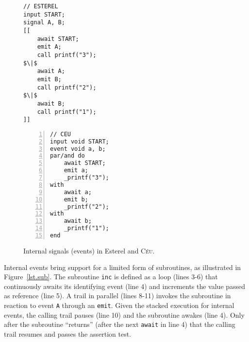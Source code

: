 \documentclass{acm_proc_article-sp}
\newcommand{\CEU}{\textsc{C\'{e}u}\xspace}
\newcommand{\code}[1] {{\small{\texttt{#1}}}}
\newcommand{\1}{\;}
\newcommand{\2}{\;\;}
\newcommand{\3}{\;\;\;}
\newcommand{\5}{\;\;\;\;\;}
\begin{document}
\begin{figure}[!t]
\begin{minipage}[t]{0.45\linewidth}
\begin{lstlisting}[mathescape=true]
// ESTEREL
input START;
signal A, B;
[[
    await START;
    emit A;
    call printf("3");
$\|$
    await A;
    emit B;
    call printf("2");
$\|$
    await B;
    call printf("1");
]]
\end{lstlisting}
\end{minipage}
%
\begin{minipage}[t]{0.50\linewidth}
\begin{lstlisting}[numbers=left,xleftmargin=3em]
// CEU
input void START;
event void a, b;
par/and do
    await START;
    emit a;
    _printf("3");
with
    await a;
    emit b;
    _printf("2");
with
    await b;
    _printf("1");
end
\end{lstlisting}
\end{minipage}
\caption{ Internal signals (events) in Esterel and \CEU. \newline
\label{lst.prints}
}
\end{figure}

\begin{comment}
{\small
The order of execution for the \code{printf} calls in Esterel is unspecified.
For \CEU, they always print $1$, $2$, and $3$, in this exact order.
}
Signals in Esterel have immediate feedback, i.e., an \code{await} statement can 
react to an \code{emit} in the same time it is reached.
In \CEU, only previously awaiting trails can react to an event.

immediate feedback
    flip-flops
- synthesis of digital circuits
immediate feedback (digital components as simple as flip-flops

causality complications
Note that both internal and external events are unbuffered, i.e., at the moment 
an event occurs, only previously awaiting trails can react to that instance.
\end{comment}

Internal events bring support for a limited form of subroutines, as illustrated 
in Figure~\ref{lst.sub}.
The subroutine \code{inc} is defined as a loop (lines 3-6) that continuously 
awaits its identifying event (line 4) and increments the value passed as 
reference (line 5).
A trail in parallel (lines 8-11) invokes the subroutine in reaction to event 
\code{A} through an \code{emit}.
Given the stacked execution for internal events, the calling trail pauses (line 
10) and the subroutine awakes (line 4).
Only after the subroutine ``returns'' (after the next \code{await} in line 4)
that the calling trail resumes and passes the assertion test.
 
\end{document}
